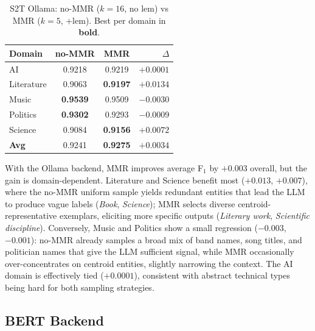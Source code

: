 \documentclass[11pt,a4paper]{article}
\begin{document}
\begin{table}[h]
\centering
\caption{S2T Ollama: no-MMR ($k{=}16$, no lem) vs MMR ($k{=}5$, +lem).
Best per domain in \textbf{bold}.}
\label{tab:ablation_oll}
\setlength{\tabcolsep}{6pt}
\small
\begin{tabular}{l cc r}
\toprule
\textbf{Domain}
  & \cellcolor{s2tollcol}\textbf{no-MMR}
  & \cellcolor{s2tmmrcol}\textbf{MMR}
  & \textbf{$\Delta$} \\
\midrule
AI         & 0.9218          & 0.9219          & $+0.0001$ \\
Literature & 0.9063          & \textbf{0.9197} & $+0.0134$ \\
Music      & \textbf{0.9539} & 0.9509          & $-0.0030$ \\
Politics   & \textbf{0.9302} & 0.9293          & $-0.0009$ \\
Science    & 0.9084          & \textbf{0.9156} & $+0.0072$ \\
\midrule
\textbf{Avg} & 0.9241        & \textbf{0.9275} & $+0.0034$ \\
\bottomrule
\end{tabular}
\end{table}

\noindent
With the Ollama backend, MMR improves average F$_1$ by
$+0.003$ overall, but the gain is domain-dependent.
Literature and Science benefit most ($+0.013$, $+0.007$), where the
no-MMR uniform sample yields redundant entities that lead the LLM to
produce vague labels (\textit{Book}, \textit{Science}); MMR selects
diverse centroid-representative exemplars, eliciting more specific
outputs (\textit{Literary work}, \textit{Scientific discipline}).
Conversely, Music and Politics show a small regression ($-0.003$,
$-0.001$): no-MMR already samples a broad mix of band names, song
titles, and politician names that give the LLM sufficient signal,
while MMR occasionally over-concentrates on centroid entities,
slightly narrowing the context.
The AI domain is effectively tied ($+0.0001$), consistent with
abstract technical types being hard for both sampling strategies.

\subsection{BERT Backend}
\end{document}

